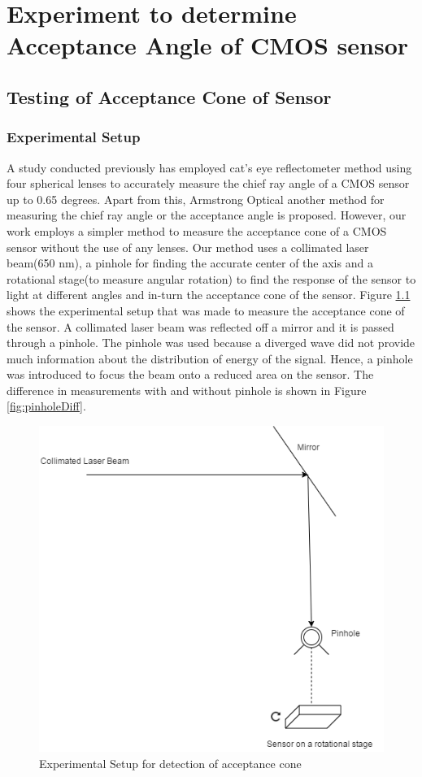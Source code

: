 \chapter{Experiment to determine Acceptance Angle of CMOS sensor}
\label{chp:Experiment_FOV}
\section{Testing of Acceptance Cone of Sensor}
\subsection{Experimental Setup}
A study conducted previously\cite{cra2} has employed cat's eye reflectometer method using four spherical lenses to accurately measure the chief ray angle of a CMOS sensor up to 0.65 degrees\cite{cra2}. Apart from this, Armstrong Optical another method for measuring the chief ray angle or the acceptance angle\cite{cra1} is proposed. However, our work employs a simpler method to measure the acceptance cone of a CMOS sensor without the use of any lenses. Our method uses a collimated laser beam(650 nm), a pinhole for finding the accurate center of the axis and a rotational stage(to measure angular rotation) to find the response of the sensor to light at different angles and in-turn the acceptance cone of the sensor. 
Figure \ref{fig:exp_acc} shows the experimental setup that was made to measure the acceptance cone of the sensor. A collimated laser beam was reflected off a mirror and it is passed through a pinhole. The pinhole was used because a diverged wave did not provide much information about the distribution of energy of the signal. Hence, a pinhole was introduced to focus the beam onto a reduced area on the sensor. The difference in measurements with and without pinhole is shown in Figure \ref{fig:pinholeDiff}.
 \begin{figure}[ht]
\centering
\includegraphics[scale=0.50]{pics/acceptanceCone.png}
\caption{Experimental Setup for detection of acceptance cone}
\label{fig:exp_acc}
\end{figure}

